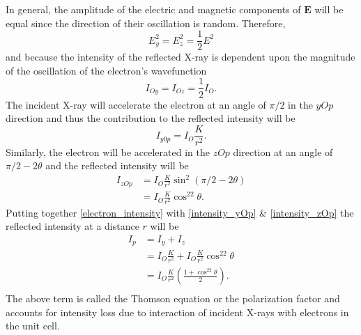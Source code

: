 In general, the amplitude of the electric and magnetic components of $\mathbf{E}$ will be equal since the direction of their oscillation is random. Therefore,
\begin{equation}
	E_y^2 = E_z^2 = \frac{1}{2}E^2
\end{equation}
and because the intensity of the reflected X-ray is dependent upon the magnitude of the oscillation of the electron's wavefunction 
\begin{equation}
	I_{Oy} = I_{Oz} = \frac{1}{2}I_O.
	\label{electron_intensity}
\end{equation}
The incident X-ray will accelerate the electron at an angle of $\pi/2$ in the $yOp$ direction and thus the contribution to the reflected intensity will be
\begin{equation}
	I_{y0p} = I_O \frac{K}{r^2}.
	\label{intensity_yOp}
\end{equation}
Similarly, the electron will be accelerated in the $zOp$ direction at an angle of $\pi/2 - 2\theta$ and the reflected intensity will be
\begin{equation}
	\begin{split}
		I_{zOp} &= I_O \frac{K}{r^2}\sin^2\left({\pi/2 - 2\theta}\right) \\
		& = I_O \frac{K}{r^2}\cos^22\theta.
	\end{split}
	\label{intensity_zOp}
\end{equation}
Putting together \ref{electron_intensity} with \ref{intensity_yOp} \& \ref{intensity_zOp} the reflected intensity at a distance $r$ will be
\begin{equation}
	\begin{split}
		I_p &= I_y + I_z \\
		& = I_O\frac{K}{r^2} + I_O\frac{K}{r^2}\cos^22\theta \\
		& = I_O \frac{K}{r^2}\left(\frac{1 + \cos^22\theta}{2}\right). \\
	\end{split}
	\label{polarization}
\end{equation}
The above term is called the Thomson equation or the polarization factor and accounts for intensity loss due to interaction of incident X-rays with electrons in the unit cell.

